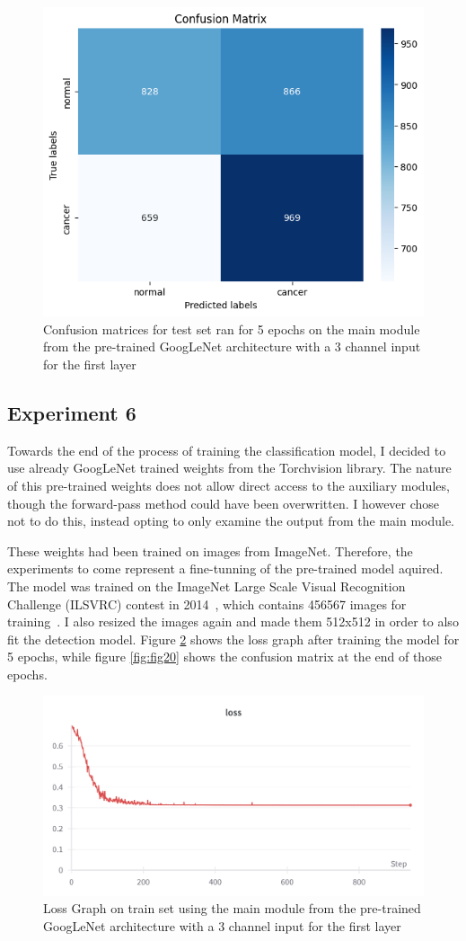 \begin{figure}
    \centering
    \includegraphics[width=0.5\linewidth]{figures/Figure39.png}
    \caption{Confusion matrices for test set ran for 5 epochs on the main module from the pre-trained GoogLeNet architecture with a 3 channel input for the first layer}
    \label{fig:fig32}
\end{figure}

\subsection{Experiment 6}

Towards the end of the process of training the classification model, I decided to use already GoogLeNet trained weights from the Torchvision library. The nature of this pre-trained weights does not allow direct access to the auxiliary modules, though the forward-pass method could have been overwritten. I however chose not to do this, instead opting to only examine the output from the main module.
 
These weights had been trained on images from ImageNet. Therefore, the experiments to come represent a fine-tunning of the pre-trained model aquired. The model was trained on the ImageNet Large Scale Visual Recognition Challenge (ILSVRC) contest in 2014~\cite{carte12}, which contains 456567 images for training~\cite{link16}. I also resized the images again and made them 512x512 in order to also fit the detection model. Figure \ref{fig:fig19} shows the loss graph after training the model for 5 epochs, while figure \ref{fig:fig20} shows the confusion matrix at the end of those epochs.

\begin{figure}[!ht]
    \centering
    \includegraphics[width=1\linewidth]{figures/Figure20.png}
    \caption{Loss Graph on train set using the main module from the pre-trained GoogLeNet architecture with a 3 channel input for the first layer}
    \label{fig:fig19}
\end{figure}

